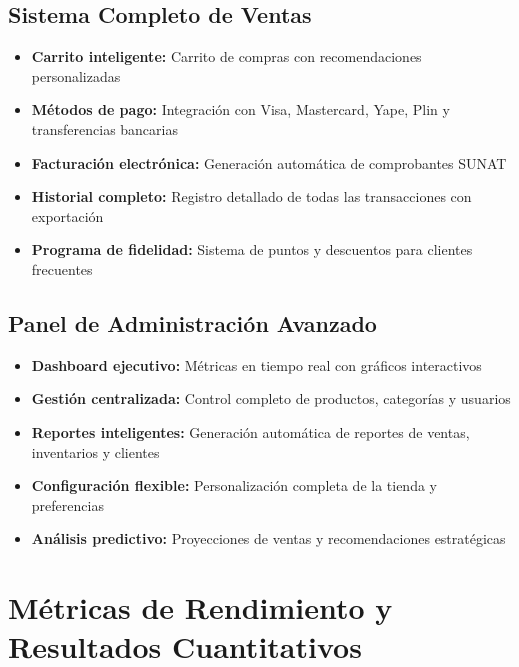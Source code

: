 \documentclass[12pt,a4paper]{report}
\begin{document}
\subsection{Sistema Completo de Ventas}
\begin{itemize}
	\item \textbf{Carrito inteligente:} Carrito de compras con recomendaciones personalizadas
	\item \textbf{Métodos de pago:} Integración con Visa, Mastercard, Yape, Plin y transferencias bancarias
	\item \textbf{Facturación electrónica:} Generación automática de comprobantes SUNAT
	\item \textbf{Historial completo:} Registro detallado de todas las transacciones con exportación
	\item \textbf{Programa de fidelidad:} Sistema de puntos y descuentos para clientes frecuentes
\end{itemize}

\subsection{Panel de Administración Avanzado}
\begin{itemize}
	\item \textbf{Dashboard ejecutivo:} Métricas en tiempo real con gráficos interactivos
	\item \textbf{Gestión centralizada:} Control completo de productos, categorías y usuarios
	\item \textbf{Reportes inteligentes:} Generación automática de reportes de ventas, inventarios y clientes
	\item \textbf{Configuración flexible:} Personalización completa de la tienda y preferencias
	\item \textbf{Análisis predictivo:} Proyecciones de ventas y recomendaciones estratégicas
\end{itemize}

\section{Métricas de Rendimiento y Resultados Cuantitativos}
\end{document}
